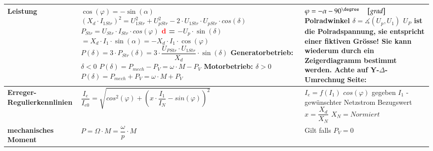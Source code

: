 \begin{longtable}[b]{| C{5cm}| P{8.5cm} | P{5 cm} |}
        \textbf{Leistung} \newline 
         &
        $\cos(\varphi) = -\sin(\alpha) $ \newline\newline
       	$ (X_d \cdot I_{1Str})^2=U_{1Str}^2+U_{pStr}^2 - 2\cdot U_{1Str}\cdot U_{pStr}\cdot cos(\delta) $ \newline \newline
       	$P_{Str} = U_{Str}\cdot I_{Str}\cdot cos(\varphi)$ \newline
        \textcolor{red}{d} = $-U_p\cdot\sin(\delta)$ \newline
        \qquad $= X_d\cdot I_1\cdot\sin(\alpha) = -X_d\cdot I_1\cdot\cos(\varphi)$ \newline \newline
        $P(\delta) = 3\cdot P_{Str}(\delta)= 3\cdot\dfrac{U_{PStr}\cdot U_{1Str}}{X_d}\cdot\sin(\delta)$ \newline
        \textbf{Generatorbetrieb:} $\delta < 0$ \newline
        $P(\delta) = P_{mech}-P_V = \omega\cdot M - P_V$ \newline
        \textbf{Motorbetrieb:} $\delta > 0$ \newline
        $P(\delta) = P_{mech} + P_V = \omega\cdot M + P_V$ &
         $\varphi = -\alpha - 90^\degree   \quad\left[ grad \right]$ \newline \newline
        Polradwinkel $\delta =  \measuredangle (U_p, U_1)$  \newline \newline
        $U_P$ ist die Polradspannung, sie entspricht einer fiktiven Grösse! Sie kann wiederum durch ein Zeigerdiagramm bestimmt werden.\newline\newline
        \textbf{ Achte auf Y-$ \Delta $-Umrechnug} \newline
        Seite: \pageref{SternDreieck}
        \\ \hline
		\textbf{Erreger-Regulierkennlinien} & 
		$ \dfrac{I_e}{I_{e0}} = \sqrt{cos^2(\varphi) + \left(x\cdot\dfrac{I_1}{I_N}-sin(\varphi)\right)^2}$ &
        $I_e = f(I_1)$ \newline $cos(\varphi)$ gegeben \newline $I_1$ - gewünschter Netzstrom \newline Bezugswert $x = \dfrac{X_d}{X_N}$ \newline $ X_N = Normiert $
		\\ \hline
		\textbf{mechanisches Moment} &  $P = \Omega\cdot M = \dfrac{\omega}{p}\cdot M$ & Gilt falls $P_V = 0$ 
		\\ \hline	
	    \end{longtable}
    
